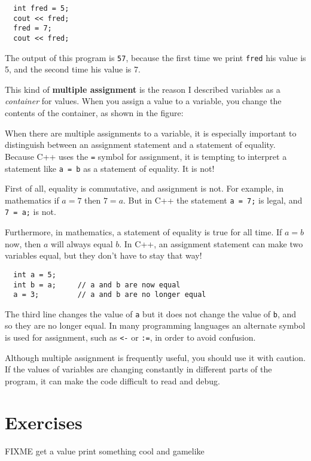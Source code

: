 \begin{verbatim}
  int fred = 5;
  cout << fred;
  fred = 7;
  cout << fred;
\end{verbatim}
%
The output of this program is {\tt 57}, because the first
time we print {\tt fred} his value is 5, and the second time
his value is 7.

This kind of {\bf multiple assignment} is the reason I
described variables as a {\em container} for values.  When
you assign a value to a variable, you change the contents of
the container, as shown in the figure:

\vspace{0.1in}
\centerline{}
\vspace{0.1in}

When there are multiple assignments to a variable, it is especially
important to distinguish between an assignment statement and a
statement of equality.  Because C++ uses the {\tt =} symbol for
assignment, it is tempting to interpret a statement like {\tt a = b}
as a statement of equality.  It is not!

First of all, equality is commutative, and assignment is not.
For example, in mathematics if $a = 7$ then $7 = a$.  But in
C++ the statement {\tt a = 7;} is legal, and {\tt 7 = a;}
is not.

Furthermore, in mathematics, a statement of equality is true
for all time.  If $a = b$ now, then $a$ will always equal $b$.
In C++, an assignment statement can make two variables equal,
but they don't have to stay that way!

\begin{verbatim}
  int a = 5;
  int b = a;     // a and b are now equal
  a = 3;         // a and b are no longer equal
\end{verbatim}
%
The third line changes the value of {\tt a} but it does not
change the value of {\tt b}, and so they are no longer equal.
In many programming languages an alternate symbol is used
for assignment, such as {\tt <-} or {\tt :=}, in order to
avoid confusion.

Although multiple assignment is frequently useful, you should
use it with caution.  If the values of variables are changing
constantly in different parts of the program, it can make
the code difficult to read and debug.

\section{Exercises}
FIXME
get a value
print something cool and gamelike
